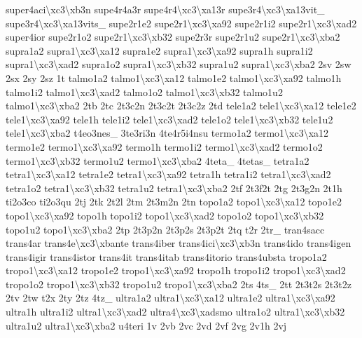 \begin{DoxyCompactItemize}
super4aci\textbackslash{}xc3\textbackslash{}xb3n supe4r4a3r supe4r4\textbackslash{}xc3\textbackslash{}xa13r supe3r4\textbackslash{}xc3\textbackslash{}xa13vit\-\_\- supe3r4\textbackslash{}xc3\textbackslash{}xa13vits\-\_\- supe2r1e2 supe2r1\textbackslash{}xc3\textbackslash{}xa92 supe2r1i2 supe2r1\textbackslash{}xc3\textbackslash{}xad2 super4ior supe2r1o2 supe2r1\textbackslash{}xc3\textbackslash{}xb32 supe2r3r supe2r1u2 supe2r1\textbackslash{}xc3\textbackslash{}xba2 supra1a2 supra1\textbackslash{}xc3\textbackslash{}xa12 supra1e2 supra1\textbackslash{}xc3\textbackslash{}xa92 supra1h supra1i2 supra1\textbackslash{}xc3\textbackslash{}xad2 supra1o2 supra1\textbackslash{}xc3\textbackslash{}xb32 supra1u2 supra1\textbackslash{}xc3\textbackslash{}xba2 2sv 2sw 2sx 2sy 2sz 1t talmo1a2 talmo1\textbackslash{}xc3\textbackslash{}xa12 talmo1e2 talmo1\textbackslash{}xc3\textbackslash{}xa92 talmo1h talmo1i2 talmo1\textbackslash{}xc3\textbackslash{}xad2 talmo1o2 talmo1\textbackslash{}xc3\textbackslash{}xb32 talmo1u2 talmo1\textbackslash{}xc3\textbackslash{}xba2 2tb 2tc 2t3c2n 2t3c2t 2t3c2z 2td tele1a2 tele1\textbackslash{}xc3\textbackslash{}xa12 tele1e2 tele1\textbackslash{}xc3\textbackslash{}xa92 tele1h tele1i2 tele1\textbackslash{}xc3\textbackslash{}xad2 tele1o2 tele1\textbackslash{}xc3\textbackslash{}xb32 tele1u2 tele1\textbackslash{}xc3\textbackslash{}xba2 t4eo3nes\-\_\- 3te3ri3n 4te4r5i4nsu termo1a2 termo1\textbackslash{}xc3\textbackslash{}xa12 termo1e2 termo1\textbackslash{}xc3\textbackslash{}xa92 termo1h termo1i2 termo1\textbackslash{}xc3\textbackslash{}xad2 termo1o2 termo1\textbackslash{}xc3\textbackslash{}xb32 termo1u2 termo1\textbackslash{}xc3\textbackslash{}xba2 4teta\-\_\- 4tetas\-\_\- tetra1a2 tetra1\textbackslash{}xc3\textbackslash{}xa12 tetra1e2 tetra1\textbackslash{}xc3\textbackslash{}xa92 tetra1h tetra1i2 tetra1\textbackslash{}xc3\textbackslash{}xad2 tetra1o2 tetra1\textbackslash{}xc3\textbackslash{}xb32 tetra1u2 tetra1\textbackslash{}xc3\textbackslash{}xba2 2tf 2t3f2t 2tg 2t3g2n 2t1h ti2o3co ti2o3qu 2tj 2tk 2t2l 2tm 2t3m2n 2tn topo1a2 topo1\textbackslash{}xc3\textbackslash{}xa12 topo1e2 topo1\textbackslash{}xc3\textbackslash{}xa92 topo1h topo1i2 topo1\textbackslash{}xc3\textbackslash{}xad2 topo1o2 topo1\textbackslash{}xc3\textbackslash{}xb32 topo1u2 topo1\textbackslash{}xc3\textbackslash{}xba2 2tp 2t3p2n 2t3p2s 2t3p2t 2tq t2r 2tr\-\_\- tran4sacc trans4ar trans4e\textbackslash{}xc3\textbackslash{}xbante trans4iber trans4ici\textbackslash{}xc3\textbackslash{}xb3n trans4ido trans4igen trans4igir trans4istor trans4it trans4itab trans4itorio trans4ubsta tropo1a2 tropo1\textbackslash{}xc3\textbackslash{}xa12 tropo1e2 tropo1\textbackslash{}xc3\textbackslash{}xa92 tropo1h tropo1i2 tropo1\textbackslash{}xc3\textbackslash{}xad2 tropo1o2 tropo1\textbackslash{}xc3\textbackslash{}xb32 tropo1u2 tropo1\textbackslash{}xc3\textbackslash{}xba2 2ts 4ts\-\_\- 2tt 2t3t2s 2t3t2z 2tv 2tw t2x 2ty 2tz 4tz\-\_\- ultra1a2 ultra1\textbackslash{}xc3\textbackslash{}xa12 ultra1e2 ultra1\textbackslash{}xc3\textbackslash{}xa92 ultra1h ultra1i2 ultra1\textbackslash{}xc3\textbackslash{}xad2 ultra4\textbackslash{}xc3\textbackslash{}xadsmo ultra1o2 ultra1\textbackslash{}xc3\textbackslash{}xb32 ultra1u2 ultra1\textbackslash{}xc3\textbackslash{}xba2 u4teri 1v 2vb 2vc 2vd 2vf 2vg 2v1h 2vj 
\end{DoxyCompactItemize}
